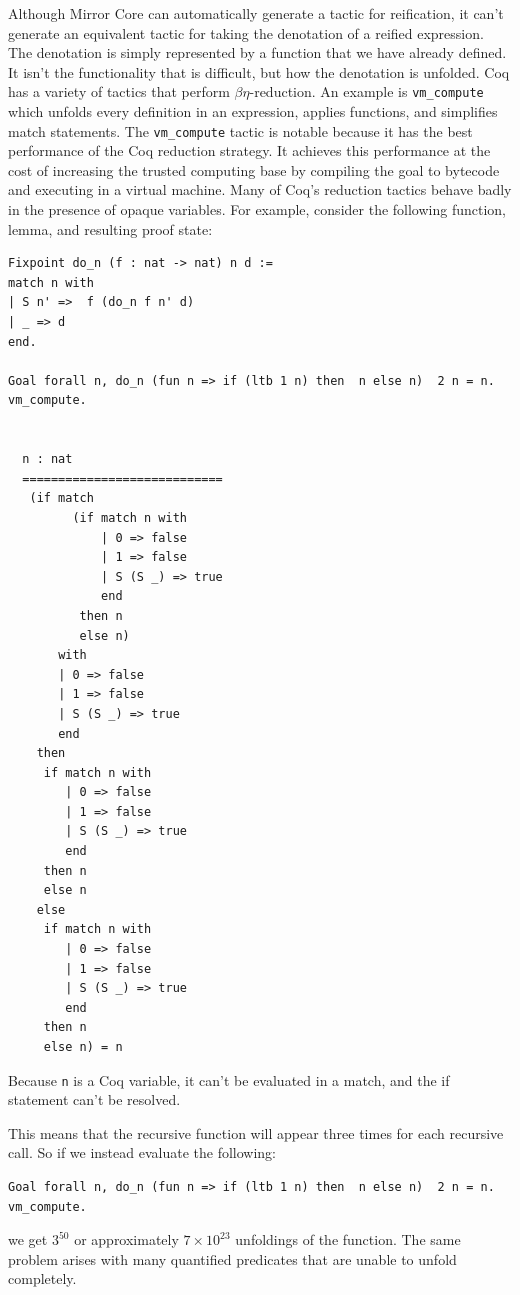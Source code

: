 \documentclass{puthesis}
\begin{document}
Although Mirror Core can automatically generate a tactic for
reification, it can't generate an equivalent tactic for taking the
denotation of a reified expression. The denotation is simply
represented by a function that we have already defined. It isn't the
functionality that is difficult, but how the denotation is
unfolded. Coq has a variety of tactics that perform
$\beta\eta$-reduction. An example is \lstinline|vm_compute| which unfolds
every definition in an expression, applies functions, and simplifies
match statements. The \lstinline|vm_compute| tactic is notable because
it has the best performance of the Coq reduction strategy. It achieves
this performance at the cost of increasing the trusted computing base
by compiling the goal to bytecode and executing in a virtual machine. 
Many of Coq's reduction tactics behave badly in the presence of opaque
variables. For example, consider the following function, lemma, and
resulting proof state:
\pagebreak
\begin{singlespace}
\begin{lstlisting}
Fixpoint do_n (f : nat -> nat) n d :=
match n with
| S n' =>  f (do_n f n' d)
| _ => d
end.

Goal forall n, do_n (fun n => if (ltb 1 n) then  n else n)  2 n = n.
vm_compute.


  n : nat
  ============================
   (if match
         (if match n with
             | 0 => false
             | 1 => false
             | S (S _) => true
             end
          then n
          else n)
       with
       | 0 => false
       | 1 => false
       | S (S _) => true
       end
    then
     if match n with
        | 0 => false
        | 1 => false
        | S (S _) => true
        end
     then n
     else n
    else
     if match n with
        | 0 => false
        | 1 => false
        | S (S _) => true
        end
     then n
     else n) = n
\end{lstlisting}
\end{singlespace}
Because \lstinline|n| is a Coq variable, it can't be evaluated in a
match, and the if statement can't be resolved.

This means that
the recursive function will appear three times for each recursive
call. So if we instead evaluate the following:

\begin{lstlisting}
Goal forall n, do_n (fun n => if (ltb 1 n) then  n else n)  2 n = n.
vm_compute.
\end{lstlisting}

\noindent we get  $3^{50}$ or approximately $7\times 10^{23}$ unfoldings
of the function. The same problem arises with many quantified
predicates that are unable to unfold completely. 
\end{document}
